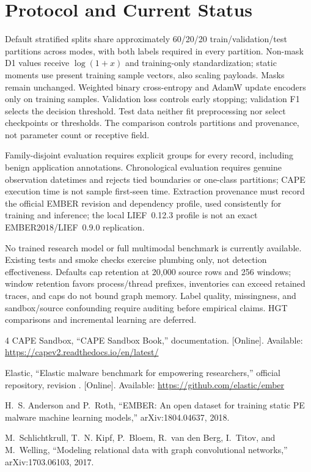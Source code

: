 \documentclass[journal]{IEEEtran}
\begin{document}
\section{Protocol and Current Status}
Default stratified splits share approximately 60/20/20 train/validation/test
partitions across modes, with both labels required in every partition.
Non-mask D1 values receive $\log(1+x)$ and training-only standardization;
static moments use present training sample vectors, also scaling payloads.
Masks remain unchanged. Weighted binary cross-entropy and AdamW update
encoders only on training samples. Validation loss controls early stopping;
validation F1 selects the decision threshold. Test data neither fit
preprocessing nor select checkpoints or thresholds. The comparison controls
partitions and provenance, not parameter count or receptive field.

Family-disjoint evaluation requires explicit groups for every record,
including benign application annotations. Chronological evaluation requires
genuine observation datetimes and rejects tied boundaries or one-class
partitions; CAPE execution time is not sample first-seen time. Extraction
provenance must record the official EMBER revision and dependency profile,
used consistently for training and inference; the local LIEF~0.12.3 profile
is not an exact EMBER2018/LIEF~0.9.0 replication.

No trained research model or full multimodal benchmark is currently
available. Existing tests and smoke checks exercise plumbing only, not
detection effectiveness. Defaults cap retention at 20,000 source rows and
256 windows;
window retention favors process/thread prefixes, inventories can exceed
retained traces, and caps do not bound graph memory. Label quality,
missingness, and sandbox/source confounding require auditing before empirical
claims. HGT comparisons and incremental learning are deferred.

\begin{thebibliography}{4}
CAPE Sandbox, ``CAPE Sandbox Book,'' documentation. [Online]. Available:
\url{https://capev2.readthedocs.io/en/latest/}

Elastic, ``Elastic malware benchmark for empowering researchers,'' official
repository, revision .
[Online]. Available: \url{https://github.com/elastic/ember}

H.~S. Anderson and P.~Roth, ``EMBER: An open dataset for training static PE
malware machine learning models,'' arXiv:1804.04637, 2018.

M.~Schlichtkrull, T.~N. Kipf, P.~Bloem, R.~van den Berg, I.~Titov, and
M.~Welling, ``Modeling relational data with graph convolutional networks,''
arXiv:1703.06103, 2017.
\end{thebibliography}
\end{document}
